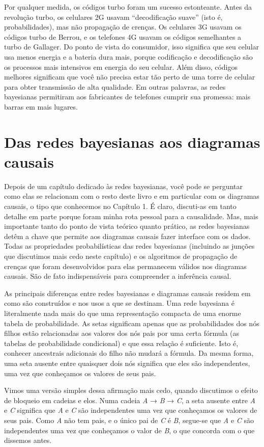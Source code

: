 \documentclass[11pt,a5paper,twoside]{book}
\begin{document}
Por qualquer medida, os códigos turbo foram um sucesso estonteante. Antes da revolução turbo, os celulares 2G usavam “decodificação suave” (isto é, probabilidades), mas não propagação de crenças. Os celulares 3G usavam os códigos turbo de Berrou, e os telefones 4G usavam os códigos semelhantes a turbo de Gallager. Do ponto de vista do consumidor, isso significa que seu celular usa menos energia e a bateria dura mais, porque codificação e decodificação são os processos mais intensivos em energia do seu celular. Além disso, códigos melhores significam que você não precisa estar tão perto de uma torre de celular para obter transmissão de alta qualidade. Em outras palavras, as redes bayesianas permitiram aos fabricantes de telefones cumprir sua promessa: mais barras em mais lugares.

\section{Das redes bayesianas aos diagramas causais}
Depois de um capítulo dedicado às redes bayesianas, você pode se perguntar como elas se relacionam com o resto deste livro e em particular com os diagramas causais, o tipo que conhecemos no Capítulo 1. É claro, discuti-as em tanto detalhe em parte porque foram minha rota pessoal para a causalidade. Mas, mais importante tanto do ponto de vista teórico quanto prático, as redes bayesianas detêm a chave que permite aos diagramas causais fazer interface com os dados. Todas as propriedades probabilísticas das redes bayesianas (incluindo as junções que discutimos mais cedo neste capítulo) e os algoritmos de propagação de crenças que foram desenvolvidos para elas permanecem válidos nos diagramas causais. São de fato indispensáveis para compreender a inferência causal.

As principais diferenças entre redes bayesianas e diagramas causais residem em como são construídos e nos usos a que se destinam. Uma rede bayesiana é literalmente nada mais do que uma representação compacta de uma enorme tabela de probabilidade. As setas significam apenas que as probabilidades dos nós filhos estão relacionadas aos valores dos nós pais por uma certa fórmula (as tabelas de probabilidade condicional) e que essa relação é suficiente. Isto é, conhecer ancestrais adicionais do filho não mudará a fórmula. Da mesma forma, uma seta ausente entre quaisquer dois nós significa que eles são independentes, uma vez que conheçamos os valores de seus pais.

Vimos uma versão simples dessa afirmação mais cedo, quando discutimos o efeito de bloqueio em cadeias e elos. Numa cadeia \textit{A} → \textit{B} → \textit{C}, a seta ausente entre \textit{A} e \textit{C} significa que \textit{A} e \textit{C} são independentes uma vez que conheçamos os valores de seus pais. Como \textit{A} não tem pais, e o único pai de \textit{C} é \textit{B}, segue-se que \textit{A} e \textit{C} são independentes uma vez que conheçamos o valor de \textit{B}, o que concorda com o que dissemos antes.
\end{document}
